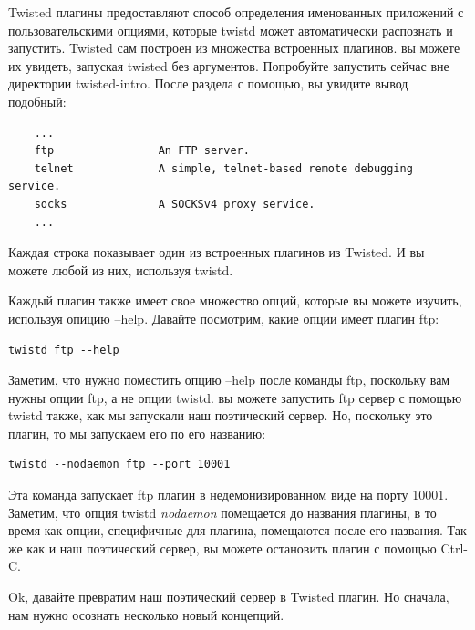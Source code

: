 Twisted плагины предоставляют способ 
определения именованных приложений с 
пользовательскими опциями, которые 
twistd может автоматически распознать и 
запустить. Twisted сам построен из 
множества встроенных плагинов. вы можете 
их увидеть, запуская twisted без аргументов. Попробуйте 
запустить сейчас вне директории twisted-intro. 
После раздела с помощью, вы увидите вывод подобный:

\begin{scriptsize}\begin{verbatim}
    ...
    ftp                An FTP server.
    telnet             A simple, telnet-based remote debugging service.
    socks              A SOCKSv4 proxy service.
    ...
\end{verbatim}\end{scriptsize}


Каждая строка показывает один из встроенных плагинов из Twisted. 
И вы можете любой из них, используя twistd.


Каждый плагин также имеет свое множество опций, которые вы 
можете изучить, используя опицию --help. Давайте посмотрим, 
какие опции имеет плагин ftp:

\begin{scriptsize}\begin{verbatim}
twistd ftp --help
\end{verbatim}\end{scriptsize}

Заметим, что нужно поместить опцию --help после команды 
ftp, поскольку вам нужны опции ftp, а не опции twistd.
вы можете запустить ftp сервер с помощью twistd также, 
как мы запускали наш поэтический сервер. Но, поскольку это 
плагин, то мы запускаем его по его названию:

\begin{scriptsize}\begin{verbatim}
twistd --nodaemon ftp --port 10001
\end{verbatim}\end{scriptsize}


Эта команда запускает ftp плагин в недемонизированном виде 
на порту 10001. Заметим, что опция twistd 
\textit{nodaemon} помещается 
до названия плагины, в то время как опции, специфичные для плагина, 
помещаются после его названия. Так же как и наш поэтический 
сервер, вы можете остановить плагин с помощью Ctrl-C.


Ok, давайте превратим наш поэтический сервер в Twisted 
плагин. Но сначала, нам нужно осознать несколько 
новый концепций.

